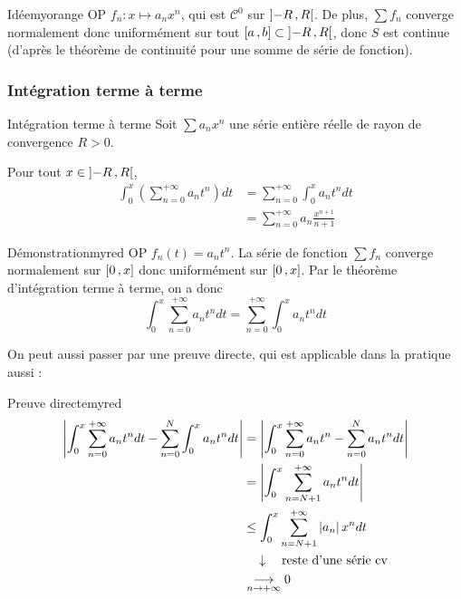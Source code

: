     \begin{demo}{Idée}{myorange}
        OP $f_n : x \mapsto a_n x^n$, qui est $\mathcal{C}^0$ sur $\left] -R \, , R \right[$. De plus, $\sum f_n$ converge normalement donc uniformément sur tout $\left[ a \, , b \right] \subset \left] -R \, , R \right[$, donc $S$ est continue (d’après le théorème de continuité pour une somme de série de fonction).
    \end{demo}

    \subsubsection{Intégration terme à terme}

    \begin{theo}{Intégration terme à terme}{}
        Soit $\sum a_n x^n$ une série entière \textcolor{myred}{réelle} de rayon de convergence $R > 0$. 

        Pour tout $x \in \left] -R \, , R \right[$,
        \begin{align*}
            \int_{0}^{x} \left(\sum_{n=0}^{+\infty} a_n t^n \right) dt 
            &= \sum_{n=0}^{+\infty} \int_{0}^{x} a_n t^n dt \\
            &= \sum_{n=0}^{+\infty} a_n \frac{x^{n+1}}{n+1}
        \end{align*}
    \end{theo}

    \begin{demo}{Démonstration}{myred}
        OP $f_n(t) = a_n t^n$. La série de fonction $\sum f_n$ converge normalement sur $\left[ 0 \, , x \right]$ donc uniformément sur $\left[ 0 \, , x \right]$. Par le théorème d’intégration terme à terme, on a donc 
        \[ \int_{0}^x \sum_{n=0}^{+\infty} a_n t^n dt = \sum_{n=0}^{+\infty} \int_{0}^{x} a_n t^n dt \]
    \end{demo}

    On peut aussi passer par une preuve directe, qui est applicable dans la pratique aussi :

    \begin{demo}{Preuve directe}{myred}
        \begin{align*}
            \left\lvert \int_{0}^{x} \sum_{n=0}^{+\infty} a_n t^n dt - \sum_{n=0}^{N} \int_{0}^{x} a_n t^n dt\right\rvert 
            &= \left\lvert \int_{0}^{x} \sum_{n=0}^{+\infty} a_n t^n - \sum_{n=0}^{N} a_n t^n dt\right\rvert \\
            &= \left\lvert \int_{0}^{x} \sum_{n=N+1}^{+\infty} a_n t^n dt\right\rvert \\
            &\leq \int_{0}^{x} \sum_{n=N+1}^{+\infty} \left\lvert a_n\right\rvert x^n dt \\
            & \quad \downarrow \quad \text{reste d’une série cv} \\
            &\underset{n \rightarrow +\infty}{\longrightarrow} 0
        \end{align*}
    \end{demo}


